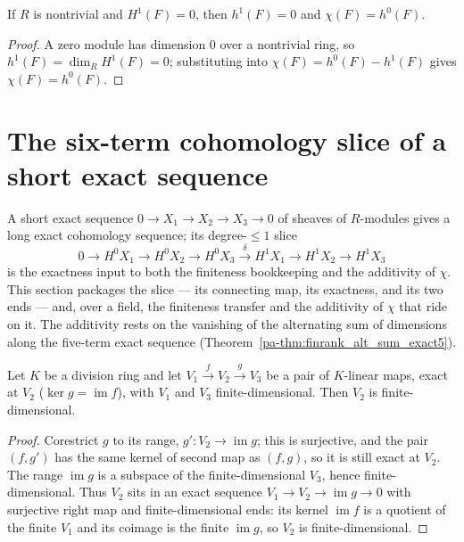 \begin{theorem}
  \label{pa-thm:chi_eq_h0}
  \leanok

  If \(R\) is nontrivial and \(H^1(F) = 0\), then \(h^1(F) = 0\) and
  \(\chi(F) = h^0(F)\).
\end{theorem}
\begin{proof}
  \leanok
  A zero module has dimension \(0\) over a nontrivial ring, so \(h^1(F) = \dim_R H^1(F) = 0\);
  substituting into \(\chi(F) = h^0(F) - h^1(F)\) gives \(\chi(F) = h^0(F)\).
\end{proof}

\section{The six-term cohomology slice of a short exact sequence}

A short exact sequence \(0 \to X_1 \to X_2 \to X_3 \to 0\) of sheaves of \(R\)-modules gives a
long exact cohomology sequence; its degree-\(\le 1\) slice
\[
  0 \to H^0 X_1 \to H^0 X_2 \to H^0 X_3 \xrightarrow{\ \delta\ }
    H^1 X_1 \to H^1 X_2 \to H^1 X_3
\]
is the exactness input to both the finiteness bookkeeping and the additivity of \(\chi\). This
section packages the slice --- its connecting map, its exactness, and its two ends --- and, over a
field, the finiteness transfer and the additivity of \(\chi\) that ride on it. The additivity rests
on the vanishing of the alternating sum of dimensions along the five-term exact sequence
(Theorem~\ref{pa-thm:finrank_alt_sum_exact5}).

\begin{theorem}
  \label{pa-thm:finiteDimensional_of_exact}
  \leanok

  Let \(K\) be a division ring and let \(V_1 \xrightarrow{f} V_2 \xrightarrow{g} V_3\) be a pair
  of \(K\)-linear maps, exact at \(V_2\) (\(\ker g = \operatorname{im} f\)), with \(V_1\) and
  \(V_3\) finite-dimensional. Then \(V_2\) is finite-dimensional.
\end{theorem}
\begin{proof}
  \leanok
  Corestrict \(g\) to its range, \(g' : V_2 \to \operatorname{im} g\); this is surjective, and the
  pair \((f, g')\) has the same kernel of second map as \((f, g)\), so it is still exact at
  \(V_2\). The range \(\operatorname{im} g\) is a subspace of the finite-dimensional \(V_3\), hence
  finite-dimensional. Thus \(V_2\) sits in an exact sequence
  \(V_1 \to V_2 \to \operatorname{im} g \to 0\) with surjective right map and finite-dimensional
  ends: its kernel \(\operatorname{im} f\) is a quotient of the finite \(V_1\) and its coimage is
  the finite \(\operatorname{im} g\), so \(V_2\) is finite-dimensional.
\end{proof}

